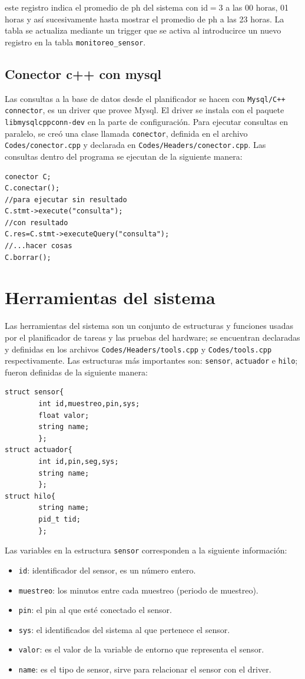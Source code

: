 \documentclass[10pt,twocolumn]{article}
\begin{document}
este registro indica el promedio de ph del sistema con id$=3$ a las 00 horas, 01 horas y as\'i sucesivamente hasta mostrar el promedio de ph a las 23 horas. La tabla se 
actualiza mediante un trigger que se activa al introducirce un nuevo registro en la tabla \verb|monitoreo_sensor|. 

\subsection{Conector c++ con mysql}
Las consultas a la base de datos desde el planificador se hacen con \verb|Mysql/C++ connector|, es un driver que provee Mysql. El driver se instala con el paquete 
\verb|libmysqlcppconn-dev|
en la parte de configuraci\'on. Para ejecutar 
consultas en paralelo, se cre\'o una clase llamada \verb|conector|, definida en el archivo \verb|Codes/conector.cpp| y declarada en \verb|Codes/Headers/conector.cpp|. 
Las consultas dentro del programa se ejecutan de la siguiente manera:

\begin{verbatim}
conector C;
C.conectar();
//para ejecutar sin resultado
C.stmt->execute("consulta");
//con resultado
C.res=C.stmt->executeQuery("consulta");
//...hacer cosas
C.borrar();
\end{verbatim}


\section{Herramientas del sistema}
Las herramientas del sistema son un conjunto de estructuras y funciones usadas por el planificador de tareas y las pruebas del hardware; se 
encuentran declaradas y definidas en los 
archivos \verb|Codes/Headers/tools.cpp| y \verb|Codes/tools.cpp| respectivamente. Las estructuras m\'as importantes son: \verb|sensor|, 
\verb|actuador| e \verb|hilo|; fueron definidas de la siguiente manera:

\begin{verbatim}
struct sensor{
        int id,muestreo,pin,sys;
        float valor;
        string name;
        };
struct actuador{
        int id,pin,seg,sys;
        string name;
        };
struct hilo{
        string name;
        pid_t tid;
        };
\end{verbatim}
Las variables en la estructura \verb|sensor| corresponden a la siguiente informaci\'on: 

\begin{itemize}
  \item \verb|id|: identificador del sensor, es un n\'umero entero.
  \item \verb|muestreo|: los minutos entre cada muestreo (periodo de muestreo). 
  \item \verb|pin|: el pin al que est\'e conectado el sensor.
  \item \verb|sys|: el identificados del sistema al que pertenece el sensor.
  \item \verb|valor|: es el valor de la variable de entorno que representa el sensor. 
  \item \verb|name|: es el tipo de sensor, sirve para relacionar el sensor con el driver. 
\end{itemize}
\end{document}

